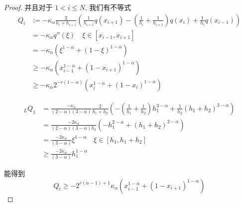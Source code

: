 \documentclass{ctexart}
\theoremstyle{definition}
\theoremstyle{remark}
\numberwithin{equation}{section}
\begin{document}
\begin{proof}
    并且对于 \(1<i\le N\), 我们有不等式
    \begin{equation}
        \begin{aligned}
            Q_i & := -\kappa_\alpha\frac{2}{h_i + h_{i+1}}
            \left( \frac{1}{h_{i+1}} q(x_{i+1})
            - (\frac{1}{h_{i}}+\frac{1}{h_{i+1}}) q(x_{i})
            +  \frac{1}{h_{i}} q(x_{i-1}) \right)                                    \\
                & = -\kappa_\alpha q''(\xi)        \quad \xi \in [x_{i-1}, x_{i+1}]             \\
                & = -\kappa_\alpha (\xi^{1-\alpha} + (1-\xi)^{1-\alpha})                        \\
                & \ge -\kappa_\alpha (x_{i-1}^{1-\alpha} + (1-x_{i+1})^{1-\alpha})              \\
                & \ge -\kappa_\alpha 2^{-r(1-\alpha)} (x_{i}^{1-\alpha} + (1-x_{i})^{1-\alpha})
        \end{aligned}
    \end{equation}

    \begin{equation}
        \begin{aligned}
            {_L}Q_1 & = \frac{-\kappa_\alpha}{(2-\alpha)(3-\alpha)} \frac{2}{h_{1} + h_{2}}
            \left( - (\frac{1}{h_{1}}+\frac{1}{h_{2}}) h_{1}^{3-\alpha}
            +  \frac{1}{h_{2}} (h_{1}+h_{2})^{3-\alpha} \right)                                       \\
                    & = \frac{-2 \kappa_\alpha}{(2-\alpha)(3-\alpha) h_{2}}
            \left( - h_{1}^{2-\alpha}
            +  (h_{1}+h_{2})^{2-\alpha} \right)                                                       \\
                    & = \frac{-2 \kappa_\alpha}{(3-\alpha)} \xi^{1-\alpha}    \quad \xi \in [h_1, h_{1}+h_{2}] \\
                    & \ge \frac{-2 \kappa_\alpha}{(3-\alpha)} h_1^{1-\alpha}
        \end{aligned}
    \end{equation}

    能得到
    \begin{equation}
        Q_i \ge - 2^{r(\alpha-1)+1} \kappa_\alpha  (x_{i-1}^{1-\alpha} + (1-x_{i+1})^{1-\alpha})
    \end{equation}
\end{proof}
\end{document}
